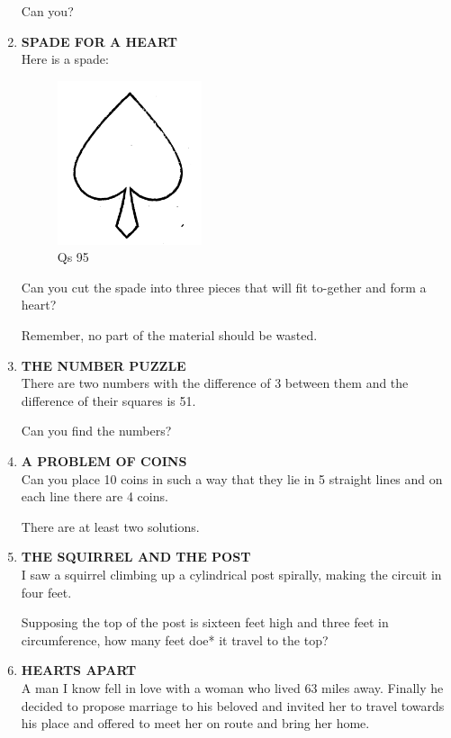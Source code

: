 \documentclass[12pt]{article}
\begin{document}
\begin{enumerate}
Can you? 
%
\item \textbf{SPADE  FOR  A HEART} \\ 
Here  is a spade:

\begin{figure}[h]
\begin{center}
\includegraphics[width=0.4\textwidth]{sdevi_q95.png}
\caption{ Qs 95}
\end{center}
\end{figure}

Can you cut the spade  into  three  pieces  that  will  fit to-gether  and form  a heart? 

Remember,  no part  of the material  should  be wasted. 
%
\item \textbf{THE  NUMBER  PUZZLE} \\
There  are  two  numbers  with  the difference  of 3 between them  and  the difference  of their  squares  is 51. 

Can you  find  the numbers? 
%
\item \textbf{A  PROBLEM  OF COINS} \\ 
Can you  place  10 coins  in such  a way  that  they  lie in 5 straight  lines  and on each  line  there  are 4 coins. 

There  are at least  two  solutions. 
%
\item \textbf{THE  SQUIRREL  AND  THE  POST} \\
I saw  a squirrel  climbing  up a cylindrical  post  spirally, making  the circuit  in four  feet. 

Supposing  the  top  of the post  is sixteen  feet high  and three  feet  in circumference,  how  many  feet doe*  it travel to the top? 
%
\item \textbf{HEARTS  APART} \\
A man  I know  fell  in love  with  a woman  who  lived  63 miles  away.  Finally  he decided  to propose  marriage  to his beloved  and invited  her to travel  towards  his place  and offered  to meet  her on route  and bring  her home. 


\end{enumerate}
\end{document}
